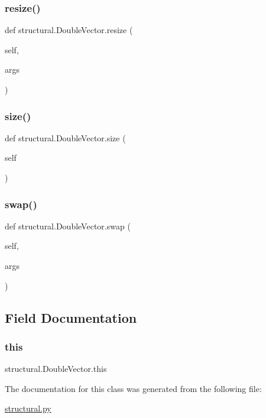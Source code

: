 \subsubsection{\texorpdfstring{resize()}{resize()}}
{\footnotesize\ttfamily def structural.\+Double\+Vector.\+resize (\begin{DoxyParamCaption}\item[{}]{self,  }\item[{}]{args }\end{DoxyParamCaption})}

\mbox{\label{classstructural_1_1_double_vector_a85afc2cc57b2479c01483c375eaac9c7}} 
\subsubsection{\texorpdfstring{size()}{size()}}
{\footnotesize\ttfamily def structural.\+Double\+Vector.\+size (\begin{DoxyParamCaption}\item[{}]{self }\end{DoxyParamCaption})}

\mbox{\label{classstructural_1_1_double_vector_a54e07f434362a474543df8c9f3a58ca1}} 
\subsubsection{\texorpdfstring{swap()}{swap()}}
{\footnotesize\ttfamily def structural.\+Double\+Vector.\+swap (\begin{DoxyParamCaption}\item[{}]{self,  }\item[{}]{args }\end{DoxyParamCaption})}



\subsection{Field Documentation}
\mbox{\label{classstructural_1_1_double_vector_a3475f392b11340f70dfb544af8375277}} 
\subsubsection{\texorpdfstring{this}{this}}
{\footnotesize\ttfamily structural.\+Double\+Vector.\+this}



The documentation for this class was generated from the following file\+:\begin{DoxyCompactItemize}
\item 
\hyperlink{structural_8py}{structural.\+py}\end{DoxyCompactItemize}
